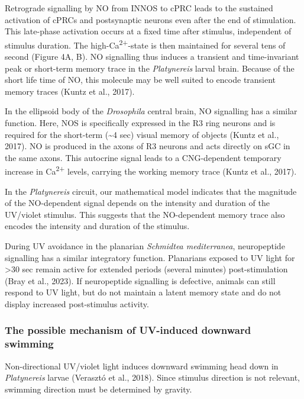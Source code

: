 \documentclass[
  11pt,
  letterpaper,
  DIV=11,
  numbers=noendperiod]{scrartcl}
\begin{document}
Retrograde signalling by NO from INNOS to cPRC leads to the sustained
activation of cPRCs and postsynaptic neurons even after the end of
stimulation. This late-phase activation occurs at a fixed time after
stimulus, independent of stimulus duration. The
high-Ca\textsuperscript{2+}-state is then maintained for several tens of
second (Figure 4A, B). NO signalling thus induces a transient and
time-invariant peak or short-term memory trace in the \emph{Platynereis}
larval brain. Because of the short life time of NO, this molecule may be
well suited to encode transient memory traces (Kuntz et al., 2017).

In the ellipsoid body of the \emph{Drosophila} central brain, NO
signalling has a similar function. Here, NOS is specifically expressed
in the R3 ring neurons and is required for the short-term
(\textasciitilde4 sec) visual memory of objects (Kuntz et al., 2017). NO
is produced in the axons of R3 neurons and acts directly on sGC in the
same axons. This autocrine signal leads to a CNG-dependent temporary
increase in Ca\textsuperscript{2+} levels, carrying the working memory
trace (Kuntz et al., 2017).

In the \emph{Platynereis} circuit, our mathematical model indicates that
the magnitude of the NO-dependent signal depends on the intensity and
duration of the UV/violet stimulus. This suggests that the NO-dependent
memory trace also encodes the intensity and duration of the stimulus.

During UV avoidance in the planarian \emph{Schmidtea mediterranea},
neuropeptide signalling has a similar integratory function. Planarians
exposed to UV light for \textgreater30 sec remain active for extended
periods (several minutes) post-stimulation (Bray et al., 2023). If
neuropeptide signalling is defective, animals can still respond to UV
light, but do not maintain a latent memory state and do not display
increased post-stimulus activity.

\subsubsection{The possible mechanism of UV-induced downward
swimming}\label{the-possible-mechanism-of-uv-induced-downward-swimming}

Non-directional UV/violet light induces downward swimming head down in
\emph{Platynereis} larvae (Verasztó et al., 2018). Since stimulus
direction is not relevant, swimming direction must be determined by
gravity.
\end{document}
